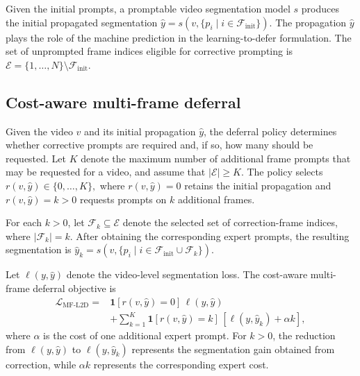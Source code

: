 Given the initial prompts, a promptable video segmentation model
\(s\) produces the initial propagated segmentation
\(
\widehat{y}
=
s\left(
v,
\{p_i\mid i\in\mathcal{F}_{\mathrm{init}}\}
\right).
\)
The propagation \(\widehat{y}\) plays the role of the machine prediction
in the learning-to-defer formulation. The set of unprompted frame indices
eligible for corrective prompting is
\(
\mathcal{E}
=
\{1,\ldots,N\}\setminus\mathcal{F}_{\mathrm{init}}.
\)

\subsection{Cost-aware multi-frame deferral}
\label{sec:cost_aware_multiframe_deferral}

Given the video \(v\) and its initial propagation \(\widehat{y}\), the
deferral policy determines whether corrective prompts are required and, if
so, how many should be requested. Let \(K\) denote the maximum number of
additional frame prompts that may be requested for a video, and assume that
\(\lvert\mathcal{E}\rvert\geq K\). The policy selects
\(
r(v,\widehat{y})\in\{0,\ldots,K\},
\)
where \(r(v,\widehat{y})=0\) retains the initial propagation and
\(r(v,\widehat{y})=k>0\) requests prompts on \(k\) additional frames.

For each \(k>0\), let
\(\mathcal{F}_k\subseteq\mathcal{E}\) denote the selected set of
correction-frame indices, where \(\lvert\mathcal{F}_k\rvert=k\). After
obtaining the corresponding expert prompts, the resulting segmentation is
\(
\widehat{y}_k
=
s\left(
v,
\{p_i\mid
i\in\mathcal{F}_{\mathrm{init}}\cup\mathcal{F}_k\}
\right).
\)

Let \(\ell(y,\widehat{y})\) denote the video-level segmentation loss.
The cost-aware multi-frame deferral objective is
\begin{equation}
\begin{aligned}
\mathcal{L}_{\mathrm{MF\text{-}L2D}}
={}&
\mathbf{1}[r(v,\widehat{y})=0]\,
\ell(y,\widehat{y})
\\
&+
\sum_{k=1}^{K}
\mathbf{1}[r(v,\widehat{y})=k]\,
\left[
\ell(y,\widehat{y}_k)+\alpha k
\right],
\end{aligned}
\label{eq:multi_frame_l2d}
\end{equation}
where \(\alpha\) is the cost of one additional expert prompt. For
\(k>0\), the reduction from
\(\ell(y,\widehat{y})\) to \(\ell(y,\widehat{y}_k)\) represents the
segmentation gain obtained from correction, while \(\alpha k\) represents
the corresponding expert cost.

